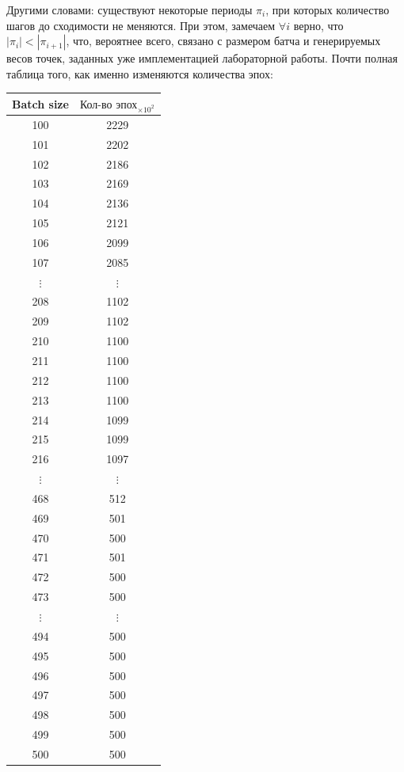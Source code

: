 \documentclass[12pt, a4paper, oneside, final]{article}
\begin{document}
	Другими словами: существуют некоторые периоды $\pi_{i}$, при которых количество шагов до сходимости не меняются.
	При этом, замечаем $\forall i$ верно, что $|\pi_{i}| < |\pi_{i + 1}|$, что, вероятнее всего, связано с размером батча и генерируемых весов точек, заданных уже имплементацией лабораторной работы.
	Почти полная таблица того, как именно изменяются количества эпох:
	\begin{table}[H]
		\centering
		\begin{tabular}{|c|c|}
			Batch size & $\text{Кол-во эпох}_{\times 10^2}$ \\ \hline
			100 & 2229 \\
			101 & 2202 \\
			102 & 2186 \\
			103 & 2169 \\
			104 & 2136 \\
			105 & 2121 \\
			106 & 2099 \\
			107 & 2085 \\
			$\vdots$ & $\vdots$ \\
			208 & 1102 \\
			209 & 1102 \\
			210 & 1100 \\
			211 & 1100 \\
			212 & 1100 \\
			213 & 1100 \\
			214 & 1099 \\
			215 & 1099 \\
			216 & 1097 \\
			$\vdots$ & $\vdots$ \\
			468 & 512 \\
			469 & 501 \\
			470 & 500 \\
			471 & 501 \\
			472 & 500 \\
			473 & 500 \\
			$\vdots$ & $\vdots$ \\
			494 & 500 \\
			495 & 500 \\
			496 & 500 \\
			497 & 500 \\
			498 & 500 \\
			499 & 500 \\
			500 & 500
		\end{tabular}
	\end{table}
\end{document}
